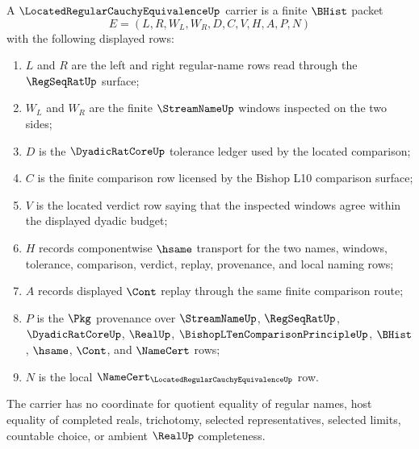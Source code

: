 \begin{definition}
\label{def:located-regular-cauchy-equivalence-carrier}
A $\LocatedRegularCauchyEquivalenceUp$ carrier is a finite $\BHist$ packet
$$
E=(L,R,W_L,W_R,D,C,V,H,A,P,N)
$$
with the following displayed rows:
\begin{enumerate}
\item $L$ and $R$ are the left and right regular-name rows read through the $\RegSeqRatUp$ surface;
\item $W_L$ and $W_R$ are the finite $\StreamNameUp$ windows inspected on the two sides;
\item $D$ is the $\DyadicRatCoreUp$ tolerance ledger used by the located comparison;
\item $C$ is the finite comparison row licensed by the Bishop L10 comparison surface;
\item $V$ is the located verdict row saying that the inspected windows agree within the displayed dyadic budget;
\item $H$ records componentwise $\hsame$ transport for the two names, windows, tolerance, comparison, verdict, replay, provenance, and local naming rows;
\item $A$ records displayed $\Cont$ replay through the same finite comparison route;
\item $P$ is the $\Pkg$ provenance over $\StreamNameUp$, $\RegSeqRatUp$, $\DyadicRatCoreUp$, $\RealUp$, $\BishopLTenComparisonPrincipleUp$, $\BHist$, $\hsame$, $\Cont$, and $\NameCert$ rows;
\item $N$ is the local $\NameCert_{\LocatedRegularCauchyEquivalenceUp}$ row.
\end{enumerate}
The carrier has no coordinate for quotient equality of regular names, host equality of completed reals, trichotomy, selected representatives, selected limits, countable choice, or ambient $\RealUp$ completeness.
\end{definition}

